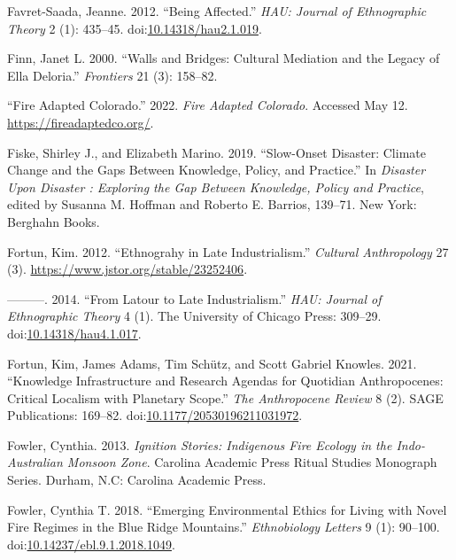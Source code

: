 \documentclass[
]{article}
\newlength{\cslhangindent}
\newenvironment{CSLReferences}[2] %
 {\begin{list}{}{%
  \setlength{\itemindent}{0pt}
  \setlength{\leftmargin}{0pt}
  \setlength{\parsep}{0pt}
  \ifodd #1
   \setlength{\leftmargin}{\cslhangindent}
   \setlength{\itemindent}{-1\cslhangindent}
  \fi
  \setlength{\itemsep}{#2\baselineskip}}}
 {\end{list}}
\begin{document}
\begin{CSLReferences}{1}{0}
Favret-Saada, Jeanne. 2012. {``Being Affected.''} \emph{HAU: Journal of Ethnographic Theory} 2 (1): 435--45. doi:\href{https://doi.org/10.14318/hau2.1.019}{10.14318/hau2.1.019}.

Finn, Janet L. 2000. {``Walls and {Bridges}: {Cultural Mediation} and the {Legacy} of {Ella Deloria}.''} \emph{Frontiers} 21 (3): 158--82.

{``Fire {Adapted Colorado}.''} 2022. \emph{Fire Adapted Colorado}. Accessed May 12. \url{https://fireadaptedco.org/}.

Fiske, Shirley J., and Elizabeth Marino. 2019. {``Slow-{Onset Disaster}: {Climate Change} and the {Gaps} Between {Knowledge}, {Policy}, and {Practice}.''} In \emph{Disaster Upon {Disaster} : {Exploring} the {Gap Between Knowledge}, {Policy} and {Practice}}, edited by Susanna M. Hoffman and Roberto E. Barrios, 139--71. New York: Berghahn Books.

Fortun, Kim. 2012. {``Ethnograhy in {Late Industrialism}.''} \emph{Cultural Anthropology} 27 (3). \url{https://www.jstor.org/stable/23252406}.

---------. 2014. {``From {Latour} to Late Industrialism.''} \emph{HAU: Journal of Ethnographic Theory} 4 (1). The University of Chicago Press: 309--29. doi:\href{https://doi.org/10.14318/hau4.1.017}{10.14318/hau4.1.017}.

Fortun, Kim, James Adams, Tim Schütz, and Scott Gabriel Knowles. 2021. {``Knowledge Infrastructure and Research Agendas for Quotidian {Anthropocenes}: {Critical} Localism with Planetary Scope.''} \emph{The Anthropocene Review} 8 (2). SAGE Publications: 169--82. doi:\href{https://doi.org/10.1177/20530196211031972}{10.1177/20530196211031972}.

Fowler, Cynthia. 2013. \emph{Ignition Stories: Indigenous Fire Ecology in the {Indo-Australian} Monsoon Zone}. Carolina {Academic Press} Ritual Studies Monograph Series. Durham, N.C: Carolina Academic Press.

Fowler, Cynthia T. 2018. {``Emerging {Environmental Ethics} for {Living} with {Novel Fire Regimes} in the {Blue Ridge Mountains}.''} \emph{Ethnobiology Letters} 9 (1): 90--100. doi:\href{https://doi.org/10.14237/ebl.9.1.2018.1049}{10.14237/ebl.9.1.2018.1049}.


\end{CSLReferences}
\end{document}
